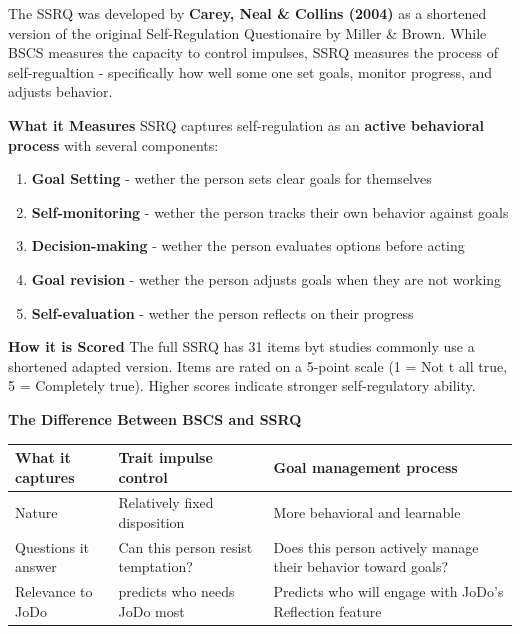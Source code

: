 \documentclass[12pt]{article}
\begin{document}
The SSRQ was developed by \textbf{Carey, Neal \& Collins (2004)} as a shortened version of the original Self-Regulation Questionaire by Miller \& Brown. While BSCS measures the capacity to control impulses, SSRQ measures the process of self-regualtion - specifically how well some one set goals, monitor progress, and adjusts behavior.

\textbf{What it Measures}
SSRQ captures self-regulation as an \textbf{active behavioral process}  with several components: 
\begin{enumerate}
    \item \textbf{Goal Setting} - wether the person sets clear goals for themselves
    \item \textbf{Self-monitoring} - wether the person tracks their own behavior against goals
    \item \textbf{Decision-making} - wether the person evaluates options before acting
    \item \textbf{Goal revision} - wether the person adjusts goals when they are not working
    \item \textbf{Self-evaluation} - wether the person reflects on their progress
\end{enumerate}

\textbf{How it is Scored}
The full SSRQ has 31 items byt studies commonly use a shortened adapted version. Items are rated on a 5-point scale (1 = Not t all true, 5 = Completely true). Higher scores indicate stronger self-regulatory ability.

\textbf{The Difference Between BSCS and SSRQ}

    \begin{tabularx}{\textwidth}{|>{\raggedright\arraybackslash}X|>{\raggedright\arraybackslash}X|>{\raggedright\arraybackslash}X|}
      \hline
         What it captures & 
         Trait impulse control & Goal management process \\
         \hline
         Nature & Relatively fixed disposition & More behavioral and learnable
        \\
        \hline
        Questions it answer & Can this person resist temptation? & Does this person actively manage their behavior toward goals?
        \\
        \hline
        Relevance to JoDo & predicts who needs JoDo most &7 Predicts who will engage with JoDo's Reflection feature
        \\
        \hline
   \end{tabularx}
\end{document}
